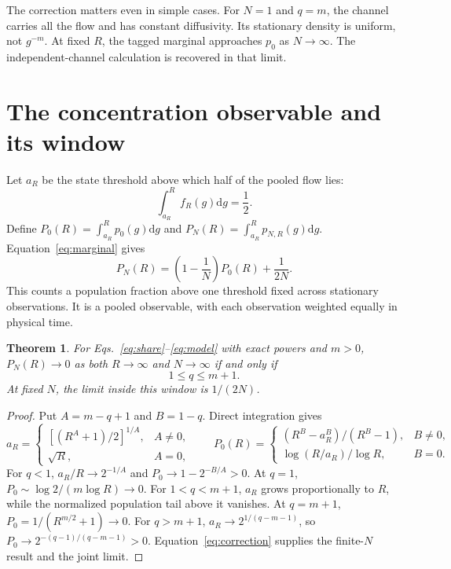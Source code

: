 \documentclass[11pt,a4paper]{article}
\newtheorem{theorem}{Theorem}
\newcommand{\dd}{\mathrm{d}}
\begin{document}
The correction matters even in simple cases. For $N=1$ and $q=m$, the channel
carries all the flow and has constant diffusivity. Its stationary density is
uniform, not $g^{-m}$. At fixed $R$, the tagged marginal approaches $p_0$ as
$N\to\infty$. The independent-channel calculation is recovered in that limit.

\section{The concentration observable and its window}

Let $a_R$ be the state threshold above which half of the pooled flow lies:
\begin{equation}
 \int_{a_R}^R f_R(g)\dd g=\frac12.
\end{equation}
Define $P_0(R)=\int_{a_R}^R p_0(g)\dd g$ and
$P_N(R)=\int_{a_R}^R p_{N,R}(g)\dd g$. Equation~\eqref{eq:marginal} gives
\begin{equation}
 \boxed{P_N(R)=\left(1-\frac1N\right)P_0(R)+\frac{1}{2N}.}
 \label{eq:correction}
\end{equation}
This counts a population fraction above one threshold fixed across stationary
observations. It is a pooled observable, with each observation weighted equally
in physical time.

\begin{theorem}
For Eqs.~\eqref{eq:share}--\eqref{eq:model} with exact powers and $m>0$,
$P_N(R)\to0$ as both $R\to\infty$ and $N\to\infty$ if and only if
\begin{equation}
 \boxed{1\leq q\leq m+1.}
 \label{eq:window}
\end{equation}
At fixed $N$, the limit inside this window is $1/(2N)$.
\end{theorem}

\begin{proof}
Put $A=m-q+1$ and $B=1-q$. Direct integration gives
\begin{equation}
 a_R=\begin{cases}
 [(R^A+1)/2]^{1/A},&A\ne0,\\
 \sqrt R,&A=0,
 \end{cases}\qquad
 P_0(R)=\begin{cases}
 (R^B-a_R^B)/(R^B-1),&B\ne0,\\
 \log(R/a_R)/\log R,&B=0.
 \end{cases}
 \label{eq:quantile}
\end{equation}
For $q<1$, $a_R/R\to2^{-1/A}$ and
$P_0\to1-2^{-B/A}>0$. At $q=1$,
$P_0\sim\log2/(m\log R)\to0$. For $1<q<m+1$, $a_R$ grows proportionally
to $R$, while the normalized population tail above it vanishes.
At $q=m+1$, $P_0=1/(R^{m/2}+1)\to0$.
For $q>m+1$, $a_R\to2^{1/(q-m-1)}$, so
$P_0\to2^{-(q-1)/(q-m-1)}>0$.
Equation~\eqref{eq:correction} supplies the finite-$N$ result and the joint limit.
\end{proof}
\end{document}
